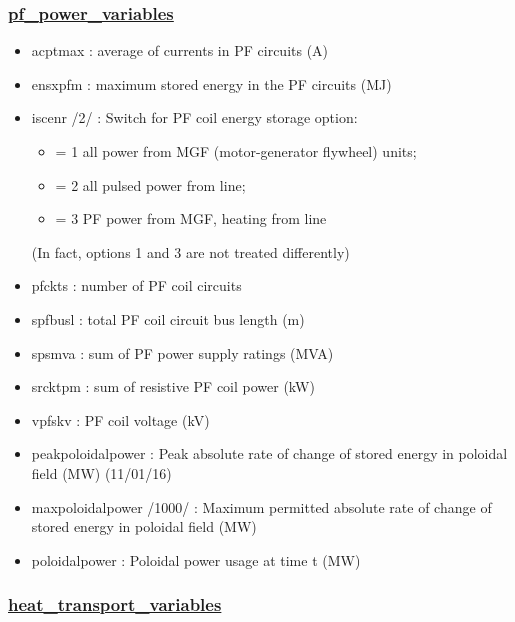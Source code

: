 \documentclass[]{article}
\begin{document}
\subsubsection{\href{pf_power_variables.html}{pf\_power\_variables}}

\begin{itemize}
\itemsep1pt\parskip0pt
\item
  acptmax : average of currents in PF circuits (A)
\item
  ensxpfm : maximum stored energy in the PF circuits (MJ)
\item
  iscenr /2/ : Switch for PF coil energy storage option:

  \begin{itemize}
  \itemsep1pt\parskip0pt
  \item
    = 1 all power from MGF (motor-generator flywheel) units;
  \item
    = 2 all pulsed power from line;
  \item
    = 3 PF power from MGF, heating from line
  \end{itemize}

  (In fact, options 1 and 3 are not treated differently)
\item
  pfckts : number of PF coil circuits
\item
  spfbusl : total PF coil circuit bus length (m)
\item
  spsmva : sum of PF power supply ratings (MVA)
\item
  srcktpm : sum of resistive PF coil power (kW)
\item
  vpfskv : PF coil voltage (kV)
\item
  peakpoloidalpower : Peak absolute rate of change of stored energy in
  poloidal field (MW) (11/01/16)
\item
  maxpoloidalpower /1000/ : Maximum permitted absolute rate of change of
  stored energy in poloidal field (MW)
\item
  poloidalpower : Poloidal power usage at time t (MW)
\end{itemize}

\subsubsection{\href{heat_transport_variables.html}{heat\_transport\_variables}}
\end{document}
